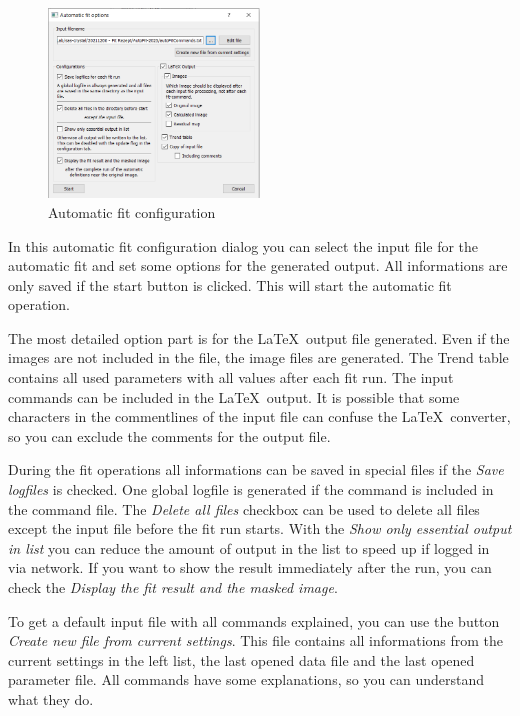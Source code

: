 \documentclass[11pt]{article} %
\begin{document}
\begin{figure}
  \begin{center}
    \includegraphics[width=0.5\textwidth]{gui-fit-auto.png}
  \end{center}
  \caption{Automatic fit configuration}
\end{figure}
In this automatic fit configuration dialog you can select the input file for the automatic fit and set some options for the generated output. All informations are only saved if the start button is clicked. This will start the automatic fit operation.

The most detailed option part is for the \LaTeX\  output file generated. Even if the images are not included in the file, the image files are generated. The Trend table contains all used parameters with all values after each fit run. The input commands can be included in the \LaTeX\  output. It is possible that some characters in the commentlines of the input file can confuse the \LaTeX\ converter, so you can exclude the comments for the output file.

During the fit operations all informations can be saved in special files if the {\it Save logfiles} is checked. One global logfile is generated if the command is included in the command file. The {\it Delete all files} checkbox can be used to delete all files except the input file before the fit run starts. With the {\it Show only essential output in list} you can reduce the amount of output in the list to speed up if logged in via network. If you want to show the result immediately after the run, you can check the {\it Display the fit result and the masked image}.

To get a default input file with all commands explained, you can use the button {\it Create new file from current settings}. This file contains all informations from the current settings in the left list, the last opened data file and the last opened parameter file. All commands have some explanations, so you can understand what they do.
\end{document}
